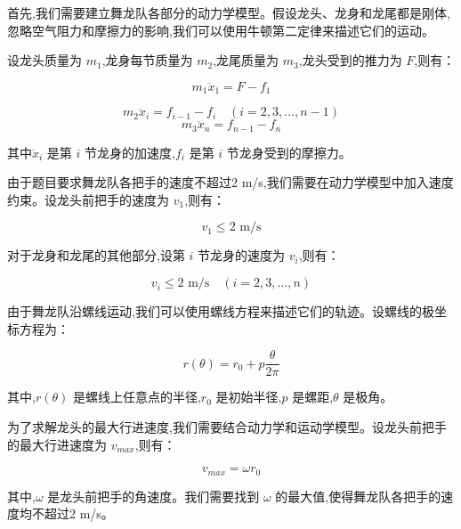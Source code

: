 首先,我们需要建立舞龙队各部分的动力学模型。假设龙头、龙身和龙尾都是刚体,忽略空气阻力和摩擦力的影响,我们可以使用牛顿第二定律来描述它们的运动。

设龙头质量为 \( m_1 \),龙身每节质量为 \( m_2 \),龙尾质量为 \( m_3 \),龙头受到的推力为 \( F \),则有：

\begin{equation}
	m_1 \ddot{x}_1 = F - f_1
\end{equation}

\begin{equation}
	m_2 \ddot{x}_i = f_{i-1} - f_i \quad (i = 2, 3, ..., n-1)
\end{equation}
\begin{equation}
	m_3 \ddot{x}_n = f_{n-1} - f_n
\end{equation}

其中\( \ddot{x}_i \) 是第 \( i \) 节龙身的加速度,\( f_i \) 是第 \( i \) 节龙身受到的摩擦力。

由于题目要求舞龙队各把手的速度不超过2 m/s,我们需要在动力学模型中加入速度约束。设龙头前把手的速度为 \( v_1 \),则有：

\begin{equation}
	v_1 \leq 2 \text{ m/s}
\end{equation}

对于龙身和龙尾的其他部分,设第 \( i \) 节龙身的速度为 \( v_i \),则有：

\begin{equation}
	v_i \leq 2 \text{ m/s} \quad (i = 2, 3, ..., n)
\end{equation}

由于舞龙队沿螺线运动,我们可以使用螺线方程来描述它们的轨迹。设螺线的极坐标方程为：

\begin{equation}
	 r(\theta) = r_0 + p\frac{\theta}{2\pi}
\end{equation}

其中,\( r(\theta) \) 是螺线上任意点的半径,\( r_0 \) 是初始半径,\( p \) 是螺距,\( \theta \) 是极角。


为了求解龙头的最大行进速度,我们需要结合动力学和运动学模型。设龙头前把手的最大行进速度为 \( v_{max} \),则有：

\begin{equation}
	v_{max} = \omega r_0
\end{equation}

其中,\( \omega \) 是龙头前把手的角速度。我们需要找到 \( \omega \) 的最大值,使得舞龙队各把手的速度均不超过2 m/s。

